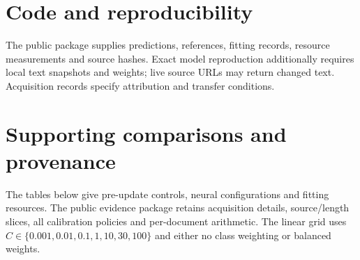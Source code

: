 \documentclass[11pt,a4paper]{article}
\begin{document}
\section*{Code and reproducibility}
The public package supplies predictions, references, fitting records, resource
measurements and source hashes. Exact model reproduction additionally requires
local text snapshots and weights; live source URLs may return changed text.
Acquisition records specify attribution and transfer conditions.


\FloatBarrier

\clearpage
\appendix
\section{Supporting comparisons and provenance}
\label{sec:supporting}
The tables below give pre-update controls, neural configurations and fitting
resources. The public evidence package retains acquisition details, source/length
slices, all calibration policies and per-document arithmetic.
The linear grid uses $C\in\{0.001,\allowbreak0.01,\allowbreak0.1,\allowbreak1,\allowbreak10,\allowbreak30,\allowbreak100\}$
and either no class weighting or balanced weights.

\end{document}
